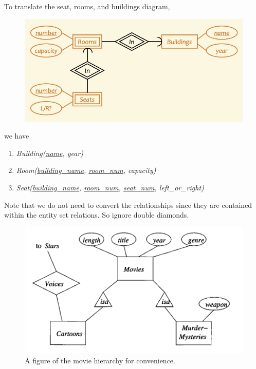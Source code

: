 \documentclass{article}
\begin{document}
    \begin{example}
      To translate the seat, rooms, and buildings diagram, 
      \begin{figure}[H]
        \centering 
        \includegraphics[scale=0.4]{img/seat.png}
        \caption{} 
        \label{fig:seat}
      \end{figure}
      we have 
      \begin{enumerate}
        \item \textit{Building(\underline{name}, year)} 
        \item \textit{Room(\underline{building\_name}, \underline{room\_num}, capacity)}
        \item \textit{Seat(\underline{building\_name}, \underline{room\_num}, \underline{seat\_num}, left\_or\_right)}
      \end{enumerate}
      Note that we do not need to convert the relationships since they are contained within the entity set relations. So ignore double diamonds. 
    \end{example}

    \begin{figure}[H]
      \centering 
      \includegraphics[scale=0.3]{img/movie_hierarchy.png}
      \caption{A figure of the movie hierarchy for convenience. } 
      \label{fig:movie_hierarchy}
    \end{figure}
\end{document}
